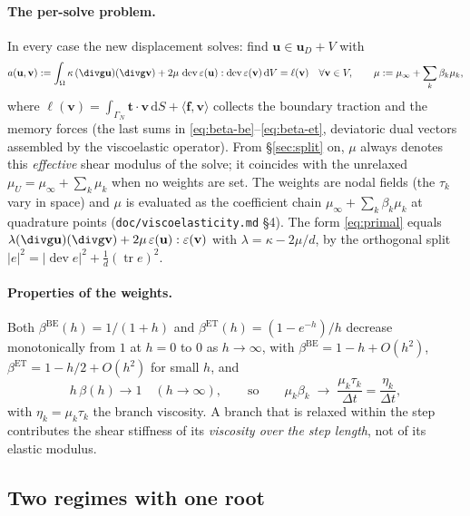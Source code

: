 \documentclass[11pt]{article}
\numberwithin{equation}{section}
\theoremstyle{remark}
\newcommand{\eps}{\varepsilon}
\newcommand{\dV}{\,\mathrm{d}V}
\newcommand{\dS}{\,\mathrm{d}S}
\newcommand{\tr}{\operatorname{tr}}
\newcommand{\dev}{\operatorname{dev}}
\newcommand{\vu}{\mathbf{u}}
\newcommand{\vv}{\mathbf{v}}
\newcommand{\vt}{\mathbf{t}}
\newcommand{\vf}{\mathbf{f}}
\newcommand{\code}[1]{\texttt{#1}}
\begin{document}
\paragraph{The per-solve problem.} In every case the new displacement
solves: find $\vu \in \vu_D + V$ with
\begin{equation}
  a(\vu,\vv) := \int_\Omega \kappa\,(\divg\vu)(\divg\vv)
   + 2\mu\,\dev\eps(\vu):\dev\eps(\vv)\dV = \ell(\vv)
  \quad \forall \vv\in V,
  \qquad
  \mu := \mu_\infty + \sum_k \beta_k \mu_k ,
  \label{eq:primal}
\end{equation}
where $\ell(\vv) = \int_{\Gamma_N}\vt\cdot\vv\dS + \langle \vf,\vv\rangle$
collects the boundary traction and the memory forces (the last sums in
\eqref{eq:beta-be}--\eqref{eq:beta-et}, deviatoric dual vectors
assembled by the viscoelastic operator). From \S\ref{sec:split} on, $\mu$
always denotes this \emph{effective} shear modulus of the solve; it
coincides with the unrelaxed $\mu_U = \mu_\infty + \sum_k\mu_k$ when no
weights are set. The weights are nodal fields (the $\tau_k$ vary in space)
and $\mu$ is evaluated as the coefficient chain $\mu_\infty + \sum_k
\beta_k\mu_k$ at quadrature points (\code{doc/viscoelasticity.md} \S4).
The form \eqref{eq:primal} equals $\lambda(\divg\vu)(\divg\vv) +
2\mu\,\eps(\vu):\eps(\vv)$ with $\lambda = \kappa - 2\mu/d$, by the
orthogonal split $|e|^2 = |\dev e|^2 + \frac1d(\tr e)^2$.

\paragraph{Properties of the weights.} Both $\beta^{\mathrm{BE}}(h) =
1/(1+h)$ and $\beta^{\mathrm{ET}}(h) = (1-e^{-h})/h$ decrease
monotonically from $1$ at $h = 0$ to $0$ as $h\to\infty$, with
$\beta^{\mathrm{BE}} = 1 - h + O(h^2)$, $\beta^{\mathrm{ET}} = 1 - h/2 +
O(h^2)$ for small $h$, and
\begin{equation}
  h\,\beta(h) \to 1 \quad (h\to\infty),
  \qquad\text{so}\qquad
  \mu_k\beta_k \;\longrightarrow\; \frac{\mu_k\tau_k}{\Delta t}
  = \frac{\eta_k}{\Delta t},
  \label{eq:collapse}
\end{equation}
with $\eta_k = \mu_k\tau_k$ the branch viscosity. A branch that is relaxed
within the step contributes the shear stiffness of its \emph{viscosity
over the step length}, not of its elastic modulus.

\subsection{Two regimes with one root}
\label{sec:regimes}
\end{document}
